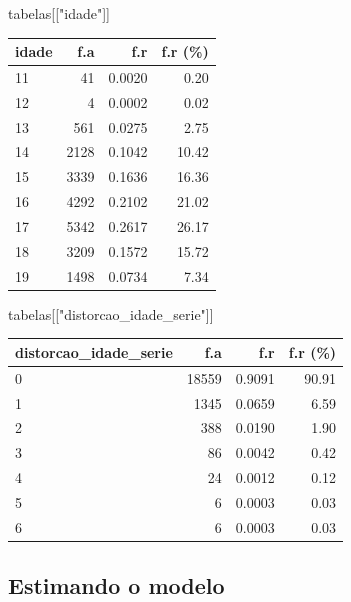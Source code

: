 \documentclass[
]{article}
\newenvironment{Shaded}{\begin{snugshade}}{\end{snugshade}}
\newcommand{\NormalTok}[1]{\textcolor[rgb]{0.00,0.23,0.31}{#1}}
\newcommand{\StringTok}[1]{\textcolor[rgb]{0.13,0.47,0.30}{#1}}
\begin{document}
\begin{Shaded}
\begin{Highlighting}[]
\NormalTok{tabelas[[}\StringTok{"idade"}\NormalTok{]]}
\end{Highlighting}
\end{Shaded}

\begin{longtable}[]{@{}lrrr@{}}
\toprule()
idade & f.a & f.r & f.r (\%) \\
\midrule()
\endhead
11 & 41 & 0.0020 & 0.20 \\
12 & 4 & 0.0002 & 0.02 \\
13 & 561 & 0.0275 & 2.75 \\
14 & 2128 & 0.1042 & 10.42 \\
15 & 3339 & 0.1636 & 16.36 \\
16 & 4292 & 0.2102 & 21.02 \\
17 & 5342 & 0.2617 & 26.17 \\
18 & 3209 & 0.1572 & 15.72 \\
19 & 1498 & 0.0734 & 7.34 \\
\bottomrule()
\end{longtable}

\begin{Shaded}
\begin{Highlighting}[]
\NormalTok{tabelas[[}\StringTok{"distorcao\_idade\_serie"}\NormalTok{]]}
\end{Highlighting}
\end{Shaded}

\begin{longtable}[]{@{}lrrr@{}}
\toprule()
distorcao\_idade\_serie & f.a & f.r & f.r (\%) \\
\midrule()
\endhead
0 & 18559 & 0.9091 & 90.91 \\
1 & 1345 & 0.0659 & 6.59 \\
2 & 388 & 0.0190 & 1.90 \\
3 & 86 & 0.0042 & 0.42 \\
4 & 24 & 0.0012 & 0.12 \\
5 & 6 & 0.0003 & 0.03 \\
6 & 6 & 0.0003 & 0.03 \\
\bottomrule()
\end{longtable}

\hypertarget{estimando-o-modelo}{%
\subsection{Estimando o modelo}\label{estimando-o-modelo}}
\end{document}
